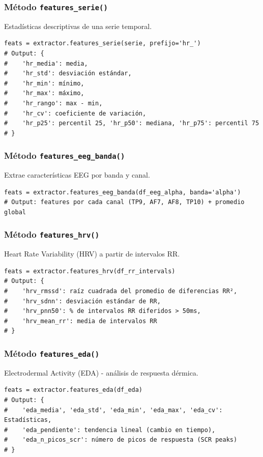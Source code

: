 \documentclass[12pt,a4paper]{article}
\begin{document}
\subsubsection{Método \texttt{features\_serie()}}

Estadísticas descriptivas de una serie temporal.

\begin{lstlisting}
feats = extractor.features_serie(serie, prefijo='hr_')
# Output: {
#    'hr_media': media,
#    'hr_std': desviación estándar,
#    'hr_min': mínimo,
#    'hr_max': máximo,
#    'hr_rango': max - min,
#    'hr_cv': coeficiente de variación,
#    'hr_p25': percentil 25, 'hr_p50': mediana, 'hr_p75': percentil 75
# }
\end{lstlisting}

\subsubsection{Método \texttt{features\_eeg\_banda()}}

Extrae características EEG por banda y canal.

\begin{lstlisting}
feats = extractor.features_eeg_banda(df_eeg_alpha, banda='alpha')
# Output: features por cada canal (TP9, AF7, AF8, TP10) + promedio global
\end{lstlisting}

\subsubsection{Método \texttt{features\_hrv()}}

Heart Rate Variability (HRV) a partir de intervalos RR.

\begin{lstlisting}
feats = extractor.features_hrv(df_rr_intervals)
# Output: {
#    'hrv_rmssd': raíz cuadrada del promedio de diferencias RR²,
#    'hrv_sdnn': desviación estándar de RR,
#    'hrv_pnn50': % de intervalos RR diferidos > 50ms,
#    'hrv_mean_rr': media de intervalos RR
# }
\end{lstlisting}

\subsubsection{Método \texttt{features\_eda()}}

Electrodermal Activity (EDA) - análisis de respuesta dérmica.

\begin{lstlisting}
feats = extractor.features_eda(df_eda)
# Output: {
#    'eda_media', 'eda_std', 'eda_min', 'eda_max', 'eda_cv': Estadísticas,
#    'eda_pendiente': tendencia lineal (cambio en tiempo),
#    'eda_n_picos_scr': número de picos de respuesta (SCR peaks)
# }
\end{lstlisting}
\end{document}
